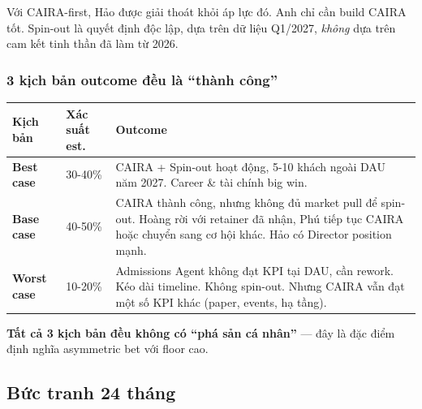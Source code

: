 \documentclass[11pt,a4paper]{article}
\begin{document}
Với CAIRA-first, Hảo được giải thoát khỏi áp lực đó. Anh chỉ cần build CAIRA
tốt. Spin-out là quyết định độc lập, dựa trên dữ liệu Q1/2027, \textit{không} dựa
trên cam kết tinh thần đã làm từ 2026.

\subsubsection*{3 kịch bản outcome đều là ``thành công''}

\begin{tabularx}{\linewidth}{@{}p{2.5cm} p{3cm} X@{}}
\toprule
\textbf{Kịch bản} & \textbf{Xác suất est.} & \textbf{Outcome} \\
\midrule
\textbf{Best case} & 30-40\% & CAIRA + Spin-out hoạt động, 5-10 khách ngoài DAU năm 2027. Career \& tài chính big win. \\
\textbf{Base case} & 40-50\% & CAIRA thành công, nhưng không đủ market pull để spin-out. Hoàng rời với retainer đã nhận, Phú tiếp tục CAIRA hoặc chuyển sang cơ hội khác. Hảo có Director position mạnh. \\
\textbf{Worst case} & 10-20\% & Admissions Agent không đạt KPI tại DAU, cần rework. Kéo dài timeline. Không spin-out. Nhưng CAIRA vẫn đạt một số KPI khác (paper, events, hạ tầng). \\
\bottomrule
\end{tabularx}

\textbf{Tất cả 3 kịch bản đều không có ``phá sản cá nhân''} --- đây là đặc điểm
định nghĩa asymmetric bet với floor cao.

\subsection{Bức tranh 24 tháng}
\end{document}
